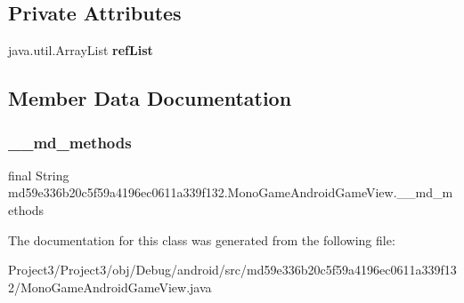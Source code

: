 \subsection*{Private Attributes}
\begin{DoxyCompactItemize}
\item 
\mbox{\label{classmd59e336b20c5f59a4196ec0611a339f132_1_1MonoGameAndroidGameView_ae5301907cc25703aad2ed7f44ced47ce}} 
java.\+util.\+Array\+List {\bfseries ref\+List}
\end{DoxyCompactItemize}


\subsection{Member Data Documentation}
\mbox{\label{classmd59e336b20c5f59a4196ec0611a339f132_1_1MonoGameAndroidGameView_a1dce1e7b3d29d79650ed8273d1cdf59e}} 
\subsubsection{\texorpdfstring{\+\_\+\+\_\+md\+\_\+methods}{\_\_md\_methods}}
{\footnotesize\ttfamily final String md59e336b20c5f59a4196ec0611a339f132.\+Mono\+Game\+Android\+Game\+View.\+\_\+\+\_\+md\+\_\+methods\hspace{0.3cm}{\ttfamily [static]}}



The documentation for this class was generated from the following file\+:\begin{DoxyCompactItemize}
\item 
Project3/\+Project3/obj/\+Debug/android/src/md59e336b20c5f59a4196ec0611a339f132/Mono\+Game\+Android\+Game\+View.\+java\end{DoxyCompactItemize}
